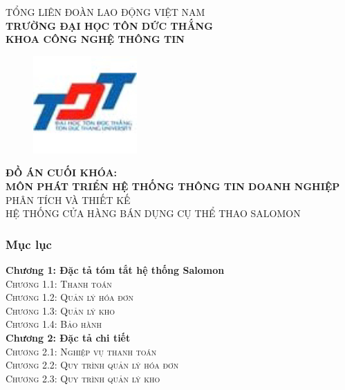 \documentclass{beamer}
\begin{document}
\begin{frame}
    \begin{center}
    \fontsize{10pt}{20pt}\selectfont
    \textsc{TỔNG LIÊN ĐOÀN LAO ĐỘNG VIỆT NAM\\}
    \textbf{TRƯỜNG ĐẠI HỌC TÔN DỨC THẮNG\\}
    \textbf{KHOA CÔNG NGHỆ THÔNG TIN\\}
    
        \begin{figure}[htp]
            \centering
           \includegraphics[scale = 0.5]{2.jpg}
        \end{figure}
    
    \fontsize{12}{20}\selectfont\textbf{ĐỒ ÁN CUỐI KHÓA:\\}
    \fontsize{12}{20}\selectfont\textbf{MÔN PHÁT TRIỂN HỆ THỐNG THÔNG TIN DOANH NGHIỆP\\}
    \fontsize{14}{20}\selectfont\textsc{PHÂN TÍCH VÀ THIẾT KẾ\\ HỆ THỐNG CỬA HÀNG BÁN DỤNG CỤ THỂ THAO SALOMON \\}
    \end{center}
\end{frame}
\begin{frame}[plain]
    \frametitle{Mục lục} 
    \fontsize{10}{20}\selectfont\textbf{Chương 1: Đặc tả tóm tắt hệ thống Salomon}\\
    \fontsize{9}{20}\selectfont\textsc{Chương 1.1: Thanh toán}\\
    \fontsize{9}{20}\selectfont\textsc{Chương 1.2: Quản lý hóa đơn}\\
    \fontsize{9}{20}\selectfont\textsc{Chương 1.3: Quản lý kho}\\
    \fontsize{9}{20}\selectfont\textsc{Chương 1.4: Bảo hành}\\[0.2cm]
    \fontsize{10}{20}\selectfont\textbf{Chương 2: Đặc tả chi tiết}\\
    \fontsize{9}{20}\selectfont\textsc{Chương 2.1: Nghiệp vụ thanh toán} \\
    \fontsize{9}{20}\selectfont\textsc{Chương 2.2: Quy trình quản lý hóa đơn} \\
    \fontsize{9}{20}\selectfont\textsc{Chương 2.3: Quy trình quản lý kho}\\[0.2cm]
    
\end{frame}
\end{document}
